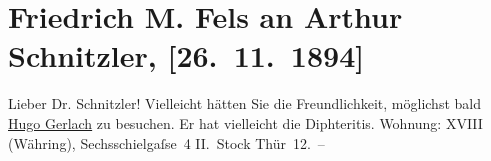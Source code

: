 

         
         \renewcommand{\erwaehntePersonen}{Personen: Friedrich Michael Fels, Hugo Gerlach, Edmund Mayer}
         \renewcommand{\erwaehnteInstitutionen}{Institutionen: Kölnische Zeitung}
         \renewcommand{\erwaehnteOrte}{Orte: Sechsschimmelgasse, Wien}
         \renewcommand{\erwaehnteWerke}{Werke: Kölnische Zeitung, Skandinavien in Deutschland}
               \section[Friedrich M. Fels an Arthur Schnitzler, {[}26. 11. 1894{]}]{ Friedrich M. Fels an Arthur Schnitzler, {[}26. 11. 1894{]}}\nopagebreak{}\rehead{ }\begin{ledgroupsized}[t]{13cm}\normalsize\beginnumbering{} \toendnotes[C]{\smallbreak\pagebreak[2]} 
\toendnotes[C]{\smallbreak}\pstart{}{\pb}Lieber Dr. Schnitzler!\pend\pstart
           Vielleicht hätten Sie die Freundlichkeit, möglichst bald \uline{Hugo Gerlach} zu besuchen. Er hat vielleicht die Diphteritis. Wohnung: XVIII (Währing), Sechsschi{\geminationm}elgaſse 4 II. Stock Thür 12. –\pend
           \pstart

\end{ledgroupsized}
